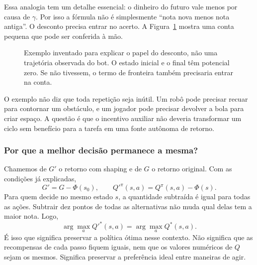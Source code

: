 \documentclass[11pt,a4paper]{article}
\begin{document}
Essa analogia tem um detalhe essencial: o dinheiro do futuro vale menos por causa de $\gamma$. Por isso a fórmula não é simplesmente ``nota nova menos nota antiga''. O desconto precisa entrar no acerto. A Figura~\ref{fig:ngcycle} mostra uma conta pequena que pode ser conferida à mão.

\begin{figure}[htbp]\centering
{}
\caption{Exemplo inventado para explicar o papel do desconto, não uma trajetória observada do bot. O estado inicial e o final têm potencial zero. Se não tivessem, o termo de fronteira também precisaria entrar na conta.}\label{fig:ngcycle}
\end{figure}

O exemplo não diz que toda repetição seja inútil. Um robô pode precisar recuar para contornar um obstáculo, e um jogador pode precisar devolver a bola para criar espaço. A questão é que o incentivo auxiliar não deveria transformar um ciclo sem benefício para a tarefa em uma fonte autônoma de retorno.

\subsubsection*{Por que a melhor decisão permanece a mesma?}
Chamemos de $G'$ o retorno com shaping e de $G$ o retorno original. Com as condições já explicadas,
\begin{equation}
 G'=G-\Phi(s_0),\qquad
 Q'^{\pi}(s,a)=Q^{\pi}(s,a)-\Phi(s).
\end{equation}
Para quem decide no mesmo estado $s$, a quantidade subtraída é igual para todas as ações. Subtrair dez pontos de todas as alternativas não muda qual delas tem a maior nota. Logo,
\begin{equation}
 \arg\max_a Q'^*(s,a)=\arg\max_a Q^*(s,a).
\end{equation}
É isso que significa preservar a política ótima nesse contexto. Não significa que as recompensas de cada passo fiquem iguais, nem que os valores numéricos de $Q$ sejam os mesmos. Significa preservar a preferência ideal entre maneiras de agir.
\end{document}
